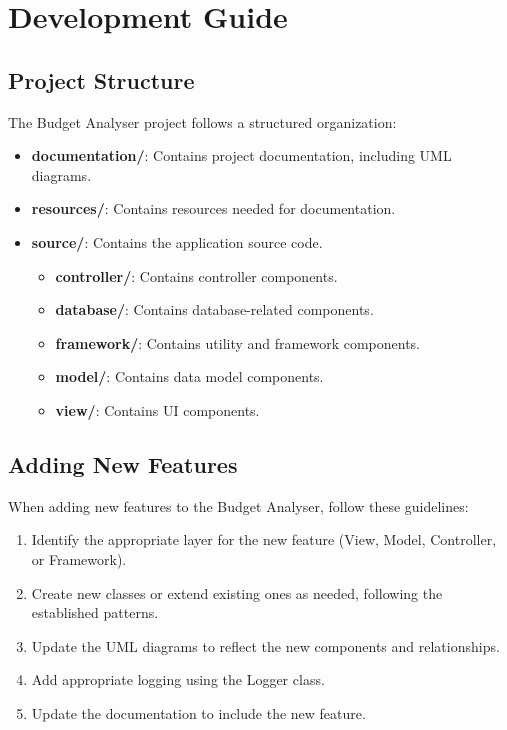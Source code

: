 \documentclass[11pt,a4paper]{report}
\begin{document}
\chapter{Development Guide}

\section{Project Structure}
The Budget Analyser project follows a structured organization:

\begin{itemize}
    \item \textbf{documentation/}: Contains project documentation, including UML diagrams.
    \item \textbf{resources/}: Contains resources needed for documentation.
    \item \textbf{source/}: Contains the application source code.
        \begin{itemize}
            \item \textbf{controller/}: Contains controller components.
            \item \textbf{database/}: Contains database-related components.
            \item \textbf{framework/}: Contains utility and framework components.
            \item \textbf{model/}: Contains data model components.
            \item \textbf{view/}: Contains UI components.
        \end{itemize}
\end{itemize}

\section{Adding New Features}
When adding new features to the Budget Analyser, follow these guidelines:

\begin{enumerate}
    \item Identify the appropriate layer for the new feature (View, Model, Controller, or Framework).
    \item Create new classes or extend existing ones as needed, following the established patterns.
    \item Update the UML diagrams to reflect the new components and relationships.
    \item Add appropriate logging using the Logger class.
    \item Update the documentation to include the new feature.
\end{enumerate}
\end{document}
